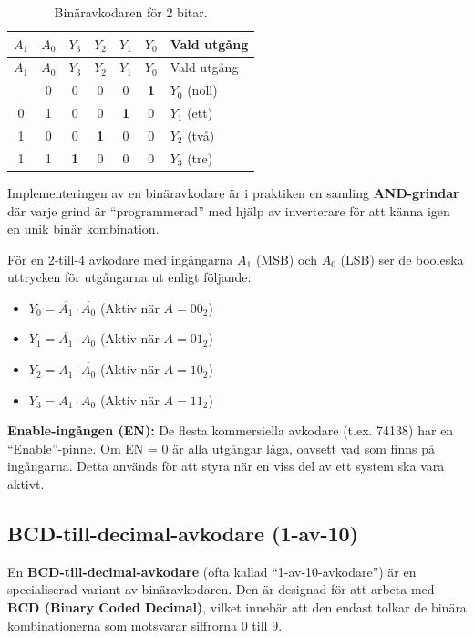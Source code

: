 \documentclass[
  swedish,
  letterpaper,
  oneside,
  openany]{book}
\providecommand{\tightlist}{%
  \setlength{\itemsep}{0pt}\setlength{\parskip}{0pt}}
\begin{document}
\begin{longtable}[]{@{}ccccccl@{}}
\caption{Binäravkodaren för 2
bitar.}\label{tbl-2-till-4-avkodare}\tabularnewline
\toprule\noalign{}
\(A_1\) & \(A_0\) & \(Y_3\) & \(Y_2\) & \(Y_1\) & \(Y_0\) & Vald
utgång \\
\midrule\noalign{}
\endfirsthead
\toprule\noalign{}
\(A_1\) & \(A_0\) & \(Y_3\) & \(Y_2\) & \(Y_1\) & \(Y_0\) & Vald
utgång \\
\midrule\noalign{}
\endhead
\bottomrule\noalign{}
\endlastfoot
0 & 0 & 0 & 0 & 0 & \textbf{1} & \(Y_0\) (noll) \\
0 & 1 & 0 & 0 & \textbf{1} & 0 & \(Y_1\) (ett) \\
1 & 0 & 0 & \textbf{1} & 0 & 0 & \(Y_2\) (två) \\
1 & 1 & \textbf{1} & 0 & 0 & 0 & \(Y_3\) (tre) \\
\end{longtable}

Implementeringen av en binäravkodare är i praktiken en samling
\textbf{AND-grindar} där varje grind är ``programmerad'' med hjälp av
inverterare för att känna igen en unik binär kombination.

För en 2-till-4 avkodare med ingångarna \(A_1\) (MSB) och \(A_0\) (LSB)
ser de booleska uttrycken för utgångarna ut enligt följande:

\begin{itemize}
\tightlist
\item
  \(Y_0 = \overline{A_1} \cdot \overline{A_0}\) (Aktiv när \(A = 00_2\))
\item
  \(Y_1 = \overline{A_1} \cdot A_0\) (Aktiv när \(A = 01_2\))
\item
  \(Y_2 = A_1 \cdot \overline{A_0}\) (Aktiv när \(A = 10_2\))
\item
  \(Y_3 = A_1 \cdot A_0\) (Aktiv när \(A = 11_2\))
\end{itemize}

\textbf{Enable-ingången (EN):} De flesta kommersiella avkodare (t.ex.
74138) har en ``Enable''-pinne. Om EN = 0 är alla utgångar låga, oavsett
vad som finns på ingångarna. Detta används för att styra när en viss del
av ett system ska vara aktivt.

\subsection{BCD-till-decimal-avkodare
(1-av-10)}\label{sec-BCD-decimal-avkodare}

En \textbf{BCD-till-decimal-avkodare} (ofta kallad ``1-av-10-avkodare'')
är en specialiserad variant av binäravkodaren. Den är designad för att
arbeta med \textbf{BCD (Binary Coded Decimal)}, vilket innebär att den
endast tolkar de binära kombinationerna som motsvarar siffrorna 0 till
9.
\end{document}

